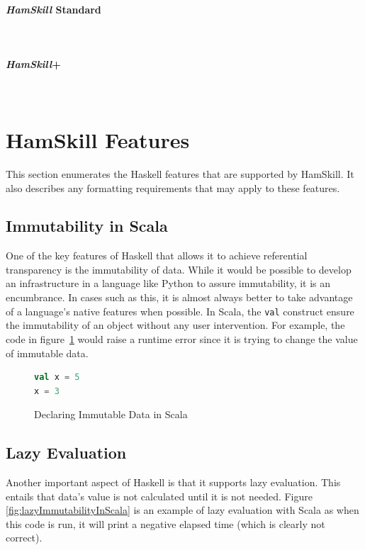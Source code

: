 \documentclass{report}
\newcommand{\myparagraph}[1]{\paragraph{#1}\mbox{}\\}
\begin{document}
\myparagraph{\textit{HamSkill} Standard}

\myparagraph{\textit{HamSkill}+}

\section{HamSkill Features}\label{sec:hamskillFeatures}

This section enumerates the Haskell features that are supported by HamSkill.  It also describes any formatting requirements that may apply to these features.

\subsection{Immutability in Scala}\label{sec:immutabilityScala}

One of the key features of Haskell that allows it to achieve referential transparency is the immutability of data.  While it would be possible to develop an infrastructure in a language like Python to assure immutability, it is an encumbrance.  In cases such as this, it is almost always better to take advantage of a language's native features when possible.  In Scala, the {\tt val} construct ensure the immutability of an object without any user intervention.  For example, the code in figure~\ref{fig:scalaValConstruct} would raise a runtime error since it is trying to change the value of immutable data.

\begin{figure}[H]
\begin{mdframed}
\begin{lstlisting}[language=Scala]
val x = 5
x = 3
\end{lstlisting}
\end{mdframed}
\caption{Declaring Immutable Data in Scala}\label{fig:scalaValConstruct}
\end{figure}

\subsection{Lazy Evaluation}\label{sec:lazyEvaluationScala}

Another important aspect of Haskell is that it supports lazy evaluation.  This entails that data's value is not calculated until it is not needed.  Figure \ref{fig:lazyImmutabilityInScala} is an example of lazy evaluation with Scala as when this code is run, it will print a negative elapsed time (which is clearly not correct).
\end{document}
